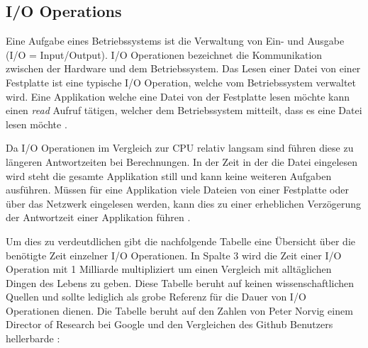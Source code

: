 \subsection{I/O Operations}
\label{subsection: io_operationen}

Eine Aufgabe eines Betriebssystems ist die Verwaltung von Ein- und Ausgabe (I/O = Input/Output). I/O Operationen bezeichnet die Kommunikation zwischen der Hardware und dem Betriebssystem. Das Lesen einer Datei von einer Festplatte ist eine typische I/O Operation, welche vom Betriebssystem verwaltet wird. Eine Applikation welche eine Datei von der Festplatte lesen möchte kann einen \emph{read} Aufruf tätigen, welcher dem Betriebssystem mitteilt, dass es eine Datei lesen möchte \cite[p. 292]{tan09}.

Da I/O Operationen im Vergleich zur CPU relativ langsam sind führen diese zu längeren Antwortzeiten bei Berechnungen.  In der Zeit in der die Datei eingelesen wird  steht die gesamte Applikation still und kann keine weiteren Aufgaben ausführen. Müssen für eine Applikation viele Dateien von einer Festplatte oder über das Netzwerk eingelesen werden, kann dies zu einer erheblichen Verzögerung der Antwortzeit einer Applikation führen \cite[p. 307]{tan09}. 

Um dies zu verdeutdlichen gibt die nachfolgende Tabelle eine Übersicht über die benötigte Zeit einzelner I/O Operationen. In Spalte 3 wird die Zeit einer I/O Operation mit 1 Milliarde multipliziert um einen Vergleich mit alltäglichen Dingen des Lebens zu geben. Diese Tabelle beruht auf keinen wissenschaftlichen Quellen und sollte lediglich als grobe Referenz für die Dauer von I/O Operationen dienen. Die Tabelle beruht auf den Zahlen von Peter Norvig \cite[]{Nor98} einem Director of Research bei Google und den Vergleichen des Github Benutzers hellerbarde \cite[]{Gis15}:


